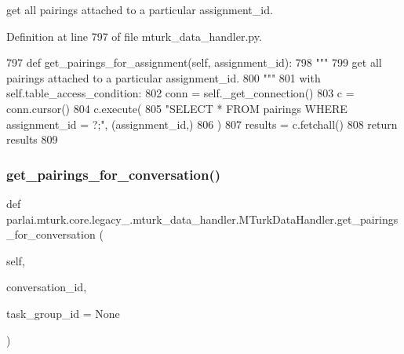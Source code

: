 \begin{DoxyVerb}get all pairings attached to a particular assignment_id.
\end{DoxyVerb}
 

Definition at line 797 of file mturk\+\_\+data\+\_\+handler.\+py.


\begin{DoxyCode}
797     \textcolor{keyword}{def }get\_pairings\_for\_assignment(self, assignment\_id):
798         \textcolor{stringliteral}{"""}
799 \textcolor{stringliteral}{        get all pairings attached to a particular assignment\_id.}
800 \textcolor{stringliteral}{        """}
801         with self.table\_access\_condition:
802             conn = self.\_get\_connection()
803             c = conn.cursor()
804             c.execute(
805                 \textcolor{stringliteral}{"SELECT * FROM pairings WHERE assignment\_id = ?;"}, (assignment\_id,)
806             )
807             results = c.fetchall()
808             \textcolor{keywordflow}{return} results
809 
\end{DoxyCode}
\mbox{\label{classparlai_1_1mturk_1_1core_1_1legacy__2018_1_1mturk__data__handler_1_1MTurkDataHandler_adeb795898ba871fdb1ea3bb7517286d3}} 
\subsubsection{\texorpdfstring{get\+\_\+pairings\+\_\+for\+\_\+conversation()}{get\_pairings\_for\_conversation()}}
{\footnotesize\ttfamily def parlai.\+mturk.\+core.\+legacy\+\_.\+mturk\+\_\+data\+\_\+handler.\+M\+Turk\+Data\+Handler.\+get\+\_\+pairings\+\_\+for\+\_\+conversation (\begin{DoxyParamCaption}\item[{}]{self,  }\item[{}]{conversation\+\_\+id,  }\item[{}]{task\+\_\+group\+\_\+id = {\ttfamily None} }\end{DoxyParamCaption})}

